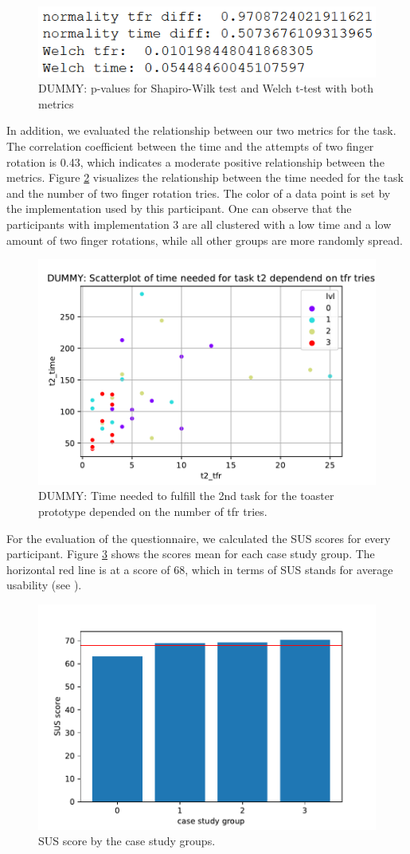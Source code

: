 \documentclass[11pt, a4paper]{article}
\begin{document}
			\begin{figure}[H]
				\centering
				\includegraphics[width=.49\textwidth]{img/stats_table_dummy.png}
				\caption{DUMMY: p-values for Shapiro-Wilk test and Welch t-test with both metrics}
				\label{fig:stats}
			\end{figure}

			In addition, we evaluated the relationship between our two metrics for the task. The correlation coefficient between the time and the attempts of two finger rotation is 0.43, which indicates a moderate positive relationship between the metrics. Figure \ref{fig:scatter} visualizes the relationship between the time needed for the task and the number of two finger rotation tries. The color of a data point is set by the implementation used by this participant. One can observe that the participants with implementation 3 are all clustered with a low time and a low amount of two finger rotations, while all other groups are more randomly spread.

			\begin{figure}[H]
				\centering
				\includegraphics[width=.49\textwidth]{img/plot/plot_scatter.pdf}
				\caption{DUMMY: Time needed to fulfill the 2nd task for the toaster prototype depended on the number of tfr tries.}
				\label{fig:scatter}
			\end{figure}

			For the evaluation of the questionnaire, we calculated the \ac{SUS} scores for every participant. Figure \ref{fig:sus} shows the scores mean for each case study group. The horizontal red line is at a score of 68, which in terms of \ac{SUS} stands for average usability (see ).

			\begin{figure}[H]
				\centering
				\includegraphics[width=.49\textwidth]{img/plot/plot_sus.pdf}
				\caption{SUS score by the case study groups.}
				\label{fig:sus}
			\end{figure}
\end{document}
